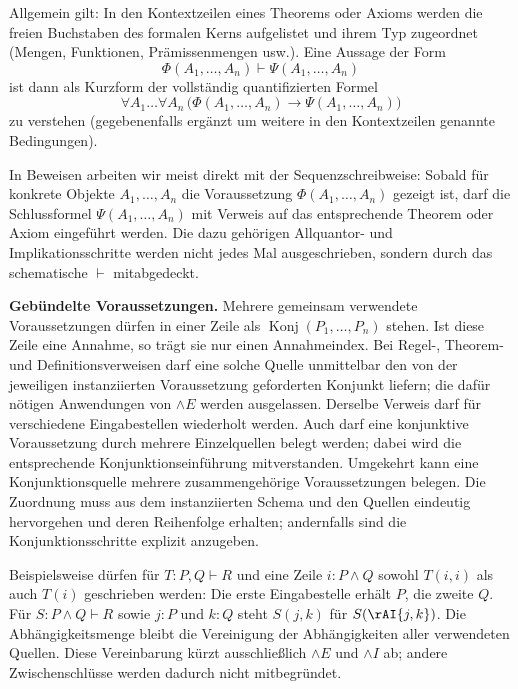 \documentclass[main.tex]{subfiles}
\begin{document}
\begin{remark}
Allgemein gilt: In den Kontextzeilen eines Theorems oder Axioms
werden die freien Buchstaben des formalen Kerns aufgelistet und
ihrem Typ zugeordnet (Mengen, Funktionen, Prämissenmengen usw.).
Eine Aussage der Form
\[
  \Phi(A_1,\dots,A_n) \vdash \Psi(A_1,\dots,A_n)
\]
ist dann als Kurzform der vollständig quantifizierten Formel
\[
  \forall A_1 \dots \forall A_n\,
  \bigl(\Phi(A_1,\dots,A_n) \rightarrow
        \Psi(A_1,\dots,A_n)\bigr)
\]
zu verstehen (gegebenenfalls ergänzt um weitere in den
Kontextzeilen genannte Bedingungen).

In Beweisen arbeiten wir meist direkt mit der Sequenzschreibweise:
Sobald für konkrete Objekte \(A_1,\dots,A_n\) die Voraussetzung
\(\Phi(A_1,\dots,A_n)\) gezeigt ist, darf die Schlussformel
\(\Psi(A_1,\dots,A_n)\) mit Verweis auf das entsprechende Theorem
oder Axiom eingeführt werden. Die dazu gehörigen Allquantor- und
Implikationsschritte werden nicht jedes Mal ausgeschrieben, sondern
durch das schematische \(\vdash\) mitabgedeckt.

\medskip\noindent\textbf{Gebündelte Voraussetzungen.}
Mehrere gemeinsam verwendete Voraussetzungen dürfen in einer Zeile als
\(\operatorname{Konj}(P_1,\ldots,P_n)\) stehen. Ist diese Zeile eine
Annahme, so trägt sie nur einen Annahmeindex. Bei Regel-, Theorem- und
Definitionsverweisen darf eine solche Quelle unmittelbar den von der
jeweiligen instanziierten Voraussetzung geforderten Konjunkt liefern;
die dafür nötigen Anwendungen von \(\land E\) werden ausgelassen.
Derselbe Verweis darf für verschiedene Eingabestellen wiederholt werden.
Auch darf eine konjunktive Voraussetzung durch mehrere Einzelquellen
belegt werden; dabei wird die entsprechende Konjunktionseinführung
mitverstanden. Umgekehrt kann eine Konjunktionsquelle mehrere
zusammengehörige Voraussetzungen belegen. Die Zuordnung muss aus dem
instanziierten Schema und den Quellen eindeutig hervorgehen und deren
Reihenfolge erhalten; andernfalls sind die Konjunktionsschritte
explizit anzugeben.

Beispielsweise dürfen für \(T\colon P,Q\vdash R\) und eine Zeile
\(i\colon P\land Q\) sowohl \(T(i,i)\) als auch \(T(i)\) geschrieben
werden: Die erste Eingabestelle erhält \(P\), die zweite \(Q\).
Für \(S\colon P\land Q\vdash R\) sowie \(j\colon P\) und
\(k\colon Q\) steht \(S(j,k)\) für \(S(\rAI{j,k})\).
Die Abhängigkeitsmenge bleibt die Vereinigung der Abhängigkeiten aller
verwendeten Quellen. Diese Vereinbarung kürzt ausschließlich
\(\land E\) und \(\land I\) ab; andere Zwischenschlüsse werden dadurch
nicht mitbegründet.
\end{remark}
\end{document}
